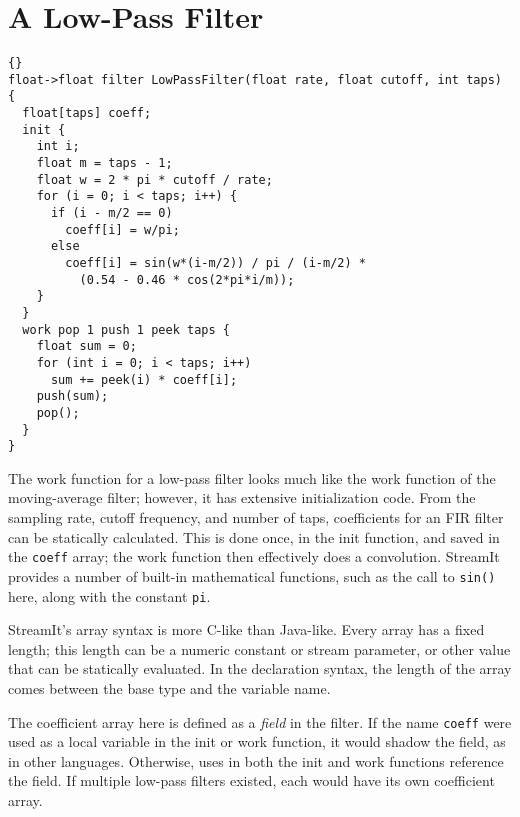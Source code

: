 \section{A Low-Pass Filter}

\begin{lstlisting}{}
float->float filter LowPassFilter(float rate, float cutoff, int taps) {
  float[taps] coeff;
  init {
    int i;
    float m = taps - 1;
    float w = 2 * pi * cutoff / rate;
    for (i = 0; i < taps; i++) {
      if (i - m/2 == 0)
        coeff[i] = w/pi;
      else
        coeff[i] = sin(w*(i-m/2)) / pi / (i-m/2) *
          (0.54 - 0.46 * cos(2*pi*i/m));
    }
  }
  work pop 1 push 1 peek taps {
    float sum = 0;
    for (int i = 0; i < taps; i++)
      sum += peek(i) * coeff[i];
    push(sum);
    pop();
  }
}
\end{lstlisting}

The work function for a low-pass filter looks much like the work
function of the moving-average filter; however, it has extensive
initialization code.  From the sampling rate, cutoff frequency, and
number of taps, coefficients for an FIR filter can be statically
calculated.  This is done once, in the init function, and saved in the
\lstinline|coeff| array; the work function then effectively does a
convolution.  StreamIt provides a number of built-in mathematical
functions, such as the call to \lstinline|sin()| here, along with
the constant \lstinline|pi|.

StreamIt's array syntax is more C-like than Java-like.  Every array
has a fixed length; this length can be a numeric constant or stream
parameter, or other value that can be statically evaluated.  In the
declaration syntax, the length of the array comes between the base
type and the variable name.

The coefficient array here is defined as a \emph{field} in the
filter.  If the name \lstinline|coeff| were used as a local variable
in the init or work function, it would shadow the field, as in other
languages.  Otherwise, uses in both the init and work functions
reference the field.  If multiple low-pass filters existed, each would
have its own coefficient array.
